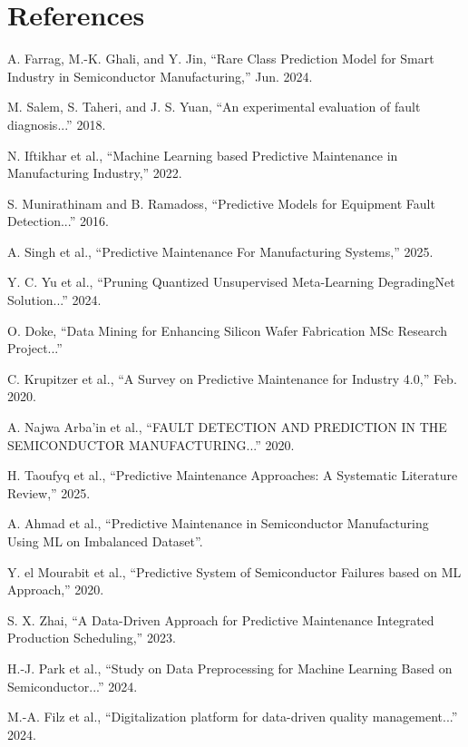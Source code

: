 \documentclass[12pt,oneside]{article}
\begin{document}
\newpage
\section{References}
\begin{enumerate}[label=\textcolor{DeepMaroon}{[\arabic*]}, leftmargin=1.5cm]
\item A. Farrag, M.-K. Ghali, and Y. Jin, ``Rare Class Prediction Model for Smart Industry in Semiconductor Manufacturing,'' Jun. 2024.
\item M. Salem, S. Taheri, and J. S. Yuan, ``An experimental evaluation of fault diagnosis...'' 2018.
\item N. Iftikhar et al., ``Machine Learning based Predictive Maintenance in Manufacturing Industry,'' 2022.
\item S. Munirathinam and B. Ramadoss, ``Predictive Models for Equipment Fault Detection...'' 2016.
\item A. Singh et al., ``Predictive Maintenance For Manufacturing Systems,'' 2025.
\item Y. C. Yu et al., ``Pruning Quantized Unsupervised Meta-Learning DegradingNet Solution...'' 2024.
\item O. Doke, ``Data Mining for Enhancing Silicon Wafer Fabrication MSc Research Project...''
\item C. Krupitzer et al., ``A Survey on Predictive Maintenance for Industry 4.0,'' Feb. 2020.
\item A. Najwa Arba’in et al., ``FAULT DETECTION AND PREDICTION IN THE SEMICONDUCTOR MANUFACTURING...'' 2020.
\item H. Taoufyq et al., ``Predictive Maintenance Approaches: A Systematic Literature Review,'' 2025.
\item A. Ahmad et al., ``Predictive Maintenance in Semiconductor Manufacturing Using ML on Imbalanced Dataset''.
\item Y. el Mourabit et al., ``Predictive System of Semiconductor Failures based on ML Approach,'' 2020.
\item S. X. Zhai, ``A Data-Driven Approach for Predictive Maintenance Integrated Production Scheduling,'' 2023.
\item H.-J. Park et al., ``Study on Data Preprocessing for Machine Learning Based on Semiconductor...'' 2024.
\item M.-A. Filz et al., ``Digitalization platform for data-driven quality management...'' 2024.
\end{enumerate}
\end{document}
